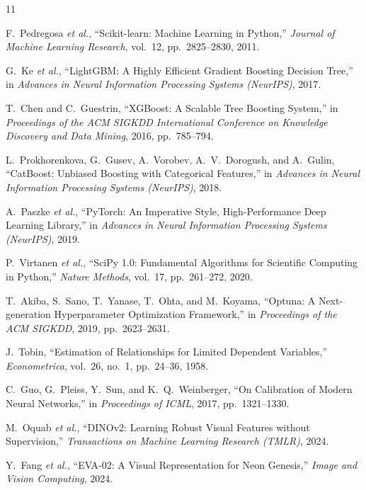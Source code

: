 \documentclass[11pt,a4paper]{article}
\renewcommand{\refname}{บรรณานุกรม}
\begin{document}
\clearpage
\renewcommand{\refname}{บรรณานุกรม}
{\raggedright
\begin{thebibliography}{11}

 F.~Pedregosa \textit{et al.}, ``Scikit-learn: Machine Learning in Python,'' \textit{Journal of Machine Learning Research}, vol.~12, pp.~2825--2830, 2011.

 G.~Ke \textit{et al.}, ``LightGBM: A Highly Efficient Gradient Boosting Decision Tree,'' in \textit{Advances in Neural Information Processing Systems (NeurIPS)}, 2017.

 T.~Chen and C.~Guestrin, ``XGBoost: A Scalable Tree Boosting System,'' in \textit{Proceedings of the ACM SIGKDD International Conference on Knowledge Discovery and Data Mining}, 2016, pp.~785--794.

 L.~Prokhorenkova, G.~Gusev, A.~Vorobev, A.~V.~Dorogush, and A.~Gulin, ``CatBoost: Unbiased Boosting with Categorical Features,'' in \textit{Advances in Neural Information Processing Systems (NeurIPS)}, 2018.

 A.~Paszke \textit{et al.}, ``PyTorch: An Imperative Style, High-Performance Deep Learning Library,'' in \textit{Advances in Neural Information Processing Systems (NeurIPS)}, 2019.

 P.~Virtanen \textit{et al.}, ``SciPy 1.0: Fundamental Algorithms for Scientific Computing in Python,'' \textit{Nature Methods}, vol.~17, pp.~261--272, 2020.

 T.~Akiba, S.~Sano, T.~Yanase, T.~Ohta, and M.~Koyama, ``Optuna: A Next-generation Hyperparameter Optimization Framework,'' in \textit{Proceedings of the ACM SIGKDD}, 2019, pp.~2623--2631.

 J.~Tobin, ``Estimation of Relationships for Limited Dependent Variables,'' \textit{Econometrica}, vol.~26, no.~1, pp.~24--36, 1958.

 C.~Guo, G.~Pleiss, Y.~Sun, and K.~Q.~Weinberger, ``On Calibration of Modern Neural Networks,'' in \textit{Proceedings of ICML}, 2017, pp.~1321--1330.

 M.~Oquab \textit{et al.}, ``DINOv2: Learning Robust Visual Features without Supervision,'' \textit{Transactions on Machine Learning Research (TMLR)}, 2024.

 Y.~Fang \textit{et al.}, ``EVA-02: A Visual Representation for Neon Genesis,'' \textit{Image and Vision Computing}, 2024.

\end{thebibliography}\par}
\end{document}
